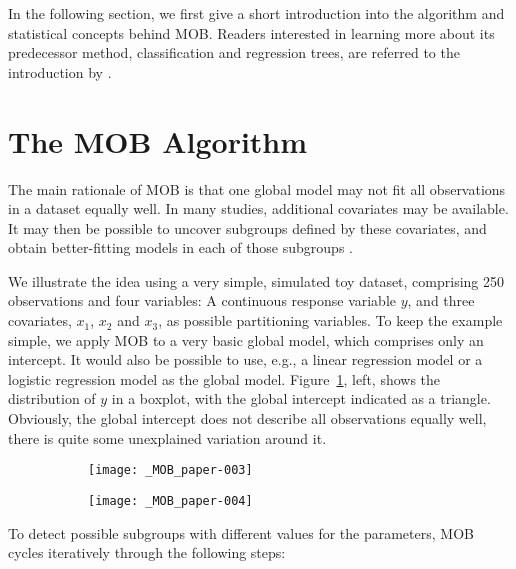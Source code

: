 \documentclass[doc,floatsintext,natbib]{apa7}
\begin{document}
In the following section, we first give a short introduction into the algorithm and statistical concepts behind MOB. Readers interested in learning more about its predecessor method, classification and regression trees, are referred to the introduction by \citet{StrMalTut:2009:PM}. 

\section{The MOB Algorithm}

The main rationale of MOB is that one global model may not fit all observations in a dataset equally well. In many studies, additional covariates may be available. It may then be possible to uncover subgroups defined by these covariates, and obtain better-fitting models in each of those subgroups \citep{ZeilyHoth08}. 


We illustrate the idea using a very simple, simulated toy dataset, comprising 250 observations and four variables: A continuous response variable $y$, and three covariates, $x_1$, $x_2$ and $x_3$, as possible partitioning variables. To keep the example simple, we apply MOB to a very basic global model, which comprises only an intercept. It would also be possible to use, e.g., a linear regression model or a logistic regression model as the global model. Figure~\ref{fig:toy}, left, shows the distribution of $y$ in a boxplot, with the global intercept indicated as a triangle. Obviously, the global intercept does not describe all observations equally well, there is quite some unexplained variation around it.


\begin{figure}[h]
\caption{Left: Univariate distribution of the response variable. Right: Tree with group-specific distributions of the response variable in the terminal nodes.}
\begin{subfigure}[][][t]{.4\textwidth}
\texttt{[image: \_MOB\_paper-003]}
\end{subfigure}
\begin{subfigure}[][][b]{.7\textwidth}
\texttt{[image: \_MOB\_paper-004]}
\end{subfigure}
\label{fig:toy}
\end{figure}



To detect possible subgroups with different values for the parameters, MOB cycles iteratively through the following steps:
\end{document}
